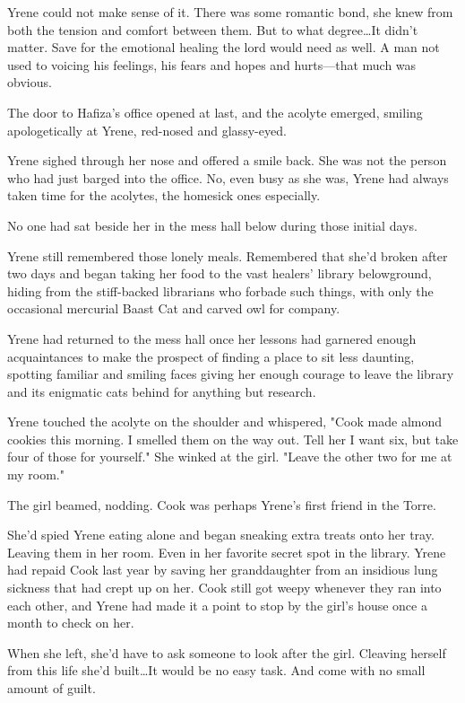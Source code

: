 Yrene could not make sense of it.
There was some romantic bond, she knew from both the tension and comfort between them.
But to what degree\ldots It didn't matter.
Save for the emotional healing the lord would need as well.
A man not used to voicing his feelings, his fears and hopes and hurts---that much was obvious.

The door to Hafiza's office opened at last, and the acolyte emerged, smiling apologetically at Yrene, red-nosed and glassy-eyed.

Yrene sighed through her nose and offered a smile back.
She was not the person who had just barged into the office.
No, even busy as she was, Yrene had always taken time for the acolytes, the homesick ones especially.

No one had sat beside her in the mess hall below during those initial days.

Yrene still remembered those lonely meals.
Remembered that she'd broken after two days and began taking her food to the vast healers' library belowground, hiding from the stiff-backed librarians who forbade such things, with only the occasional mercurial Baast Cat and carved owl for company.

Yrene had returned to the mess hall once her lessons had garnered enough acquaintances to make the prospect of finding a place to sit less daunting, spotting familiar and smiling faces giving her enough courage to leave the library and its enigmatic cats behind for anything but research.

Yrene touched the acolyte on the shoulder and whispered, "Cook made almond cookies this morning.
I smelled them on the way out.
Tell her I want six, but take four of those for yourself."
She winked at the girl.
"Leave the other two for me at my room."

The girl beamed, nodding.
Cook was perhaps Yrene's first friend in the Torre.

She'd spied Yrene eating alone and began sneaking extra treats onto her tray.
Leaving them in her room.
Even in her favorite secret spot in the library.
Yrene had repaid Cook last year by saving her granddaughter from an insidious lung sickness that had crept up on her.
Cook still got weepy whenever they ran into each other, and Yrene had made it a point to stop by the girl's house once a month to check on her.

When she left, she'd have to ask someone to look after the girl.
Cleaving herself from this life she'd built\ldots It would be no easy task.
And come with no small amount of guilt.

